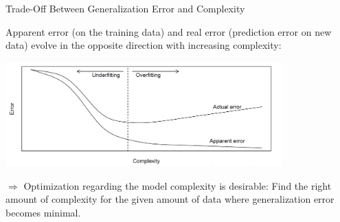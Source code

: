 \begin{frame}{Trade-Off Between Generalization Error and Complexity}

Apparent error (on the training data) and real error (prediction error
on new data) evolve in the opposite direction with increasing
complexity:

\scriptsize

\begin{center}
\includegraphics[width=0.8\textwidth]{plots/trade-off.png}
\end{center}

\normalsize  \vspace{-0.2cm} \(\Rightarrow\) Optimization regarding the
model complexity is desirable: Find the right amount of complexity for
the given amount of data where generalization error becomes minimal.

\end{frame}



%
%
%
%
%
%


